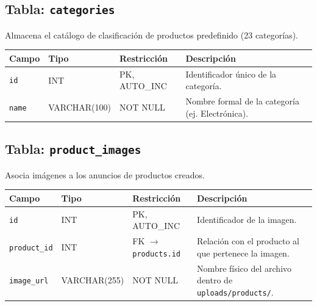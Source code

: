 \documentclass[11pt,a4paper]{report}
\begin{document}
\subsection{Tabla: \texttt{categories}}
Almacena el catálogo de clasificación de productos predefinido (23 categorías).
\begin{table}[H]
\centering
\begin{tabularx}{\textwidth}{|l|l|l|L|}
\hline
{}\textbf{Campo} & \textbf{Tipo} & \textbf{Restricción} & \textbf{Descripción} \\ \hline
\texttt{id} & INT & PK, AUTO\_INC & Identificador único de la categoría. \\ \hline
\texttt{name} & VARCHAR(100) & NOT NULL & Nombre formal de la categoría (ej. Electrónica). \\ \hline
\end{tabularx}
\end{table}

\subsection{Tabla: \texttt{product\_images}}
Asocia imágenes a los anuncios de productos creados.
\begin{table}[H]
\centering
\begin{tabularx}{\textwidth}{|l|l|l|L|}
\hline
{}\textbf{Campo} & \textbf{Tipo} & \textbf{Restricción} & \textbf{Descripción} \\ \hline
\texttt{id} & INT & PK, AUTO\_INC & Identificador de la imagen. \\ \hline
\texttt{product\_id} & INT & FK $\rightarrow$ \texttt{products.id} & Relación con el producto al que pertenece la imagen. \\ \hline
\texttt{image\_url} & VARCHAR(255) & NOT NULL & Nombre físico del archivo dentro de \texttt{uploads/products/}. \\ \hline
\end{tabularx}
\end{table}
\end{document}

